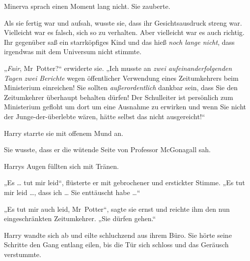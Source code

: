 Minerva sprach einen Moment lang nicht. Sie zauberte.

Als sie fertig war und aufsah, wusste sie, dass ihr Gesichtsausdruck streng war. Vielleicht war es falsch, sich so zu verhalten. Aber vielleicht war es auch richtig. Ihr gegenüber saß ein starrköpfiges Kind und das hieß \emph{noch lange nicht}, dass irgendwas mit dem Universum nicht stimmte.

„\emph{Fair}, Mr~Potter?“ erwiderte sie.
„Ich musste an \emph{zwei aufeinanderfolgenden Tagen} \emph{zwei Berichte} wegen öffentlicher Verwendung eines Zeitumkehrers beim Ministerium einreichen! Sie sollten \emph{außerordentlich} dankbar sein, dass Sie den Zeitumkehrer überhaupt behalten dürfen! Der Schulleiter ist persönlich zum Ministerium gefloht um dort um eine Ausnahme zu erwirken und wenn Sie nicht der Junge-der-überlebte wären, hätte selbst das nicht ausgereicht!“

Harry starrte sie mit offenem Mund an.

Sie wusste, dass er die wütende Seite von Professor McGonagall sah.

Harrys Augen füllten sich mit Tränen.

„Es … tut mir leid“, flüsterte er mit gebrochener und erstickter Stimme.
„Es tut mir leid …, dass ich … Sie enttäuscht habe …“

„Es tut mir auch leid, Mr~Potter“, sagte sie ernst und reichte ihm den nun eingeschränkten Zeitumkehrer.
„Sie dürfen gehen.“

Harry wandte sich ab und eilte schluchzend aus ihrem Büro. Sie hörte seine Schritte den Gang entlang eilen, bis die Tür sich schloss und das Geräusch verstummte.

